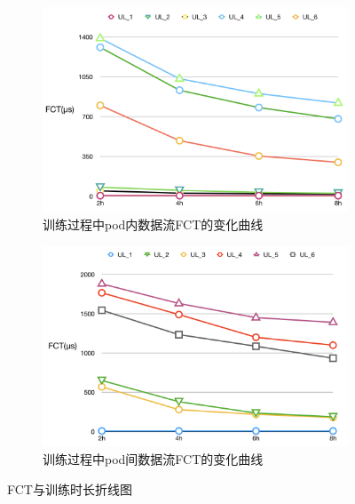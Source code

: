 \begin{figure}[htb!]
\centering
\begin{subfigure}{0.47\textwidth}
     \includegraphics[width=\textwidth]{figure/train_8h.png}
     \caption{训练过程中pod内数据流FCT的变化曲线}
\end{subfigure}\hspace{2em}
\begin{subfigure}{0.47\textwidth}
    \includegraphics[width=\textwidth]{figure/train_8h1.png}
     \caption{训练过程中pod间数据流FCT的变化曲线}
\end{subfigure}%
\caption{FCT与训练时长折线图}
\label{fig:trainingprocess}
\end{figure}

